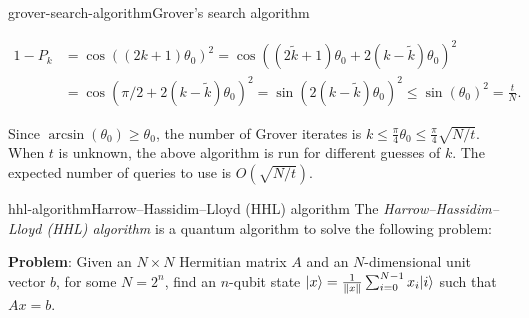 \begin{topic}{grover-search-algorithm}{Grover's search algorithm}
\begin{enumerate}[label=(\arabic*)]
\[\begin{aligned}
            1 - P_k
                &= \cos((2k + 1) \theta_0)^2 = \cos((2 \tilde{k} + 1) \theta_0 + 2 (k - \tilde{k}) \theta_0)^2 \\
                &= \cos(\pi/2 + 2 (k - \tilde{k}) \theta_0)^2 = \sin(2(k - \tilde{k}) \theta_0)^2 \le \sin(\theta_0)^2 = \frac{t}{N} .
        \end{aligned} \]
    \end{enumerate}
    Since $\arcsin(\theta_0) \ge \theta_0$, the number of Grover iterates is $k \le \tfrac{\pi}{4} \theta_0 \le \tfrac{\pi}{4} \sqrt{N/t}$. When $t$ is unknown, the above algorithm is run for different guesses of $k$. The expected number of queries to use is $O(\sqrt{N / t})$.
\end{topic}

\begin{topic}{hhl-algorithm}{Harrow--Hassidim--Lloyd (HHL) algorithm}
    The \emph{Harrow--Hassidim--Lloyd (HHL) algorithm} is a quantum algorithm to solve the following problem:

    \textbf{Problem}: Given an $N \times N$ Hermitian matrix $A$ and an $N$-dimensional unit vector $b$, for some $N = 2^n$, find an $n$-qubit state $|x\rangle = \frac{1}{\left\|x\right\|} \sum_{i = 0}^{N - 1} x_i |i\rangle$ such that $Ax = b$.


\end{topic}
